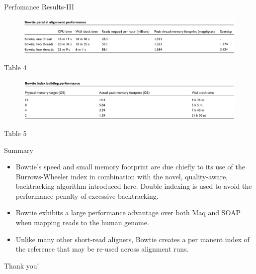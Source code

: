 \documentclass[mathserif]{beamer}
\begin{document}
\begin{frame}{Perfomance Results-III}
    \begin{figure}
        \includegraphics[width=\textwidth]{media/tab4.png}
    \end{figure}\centering \tiny Table 4
    \pause
    \begin{figure}
        \includegraphics[width=\textwidth]{media/tab5.png}
    \end{figure} \centering \tiny Table 5
\end{frame}

\begin{frame}{Summary}
    \begin{itemize}
        \item Bowtie's speed and small memory footprint are due chiefly to
        its use of the Burrows-Wheeler index in combination with the
        novel, quality-aware, backtracking algorithm introduced
        here. Double indexing is used to avoid the performance penalty
        of excessive backtracking.
        \item Bowtie exhibits a large performance advantage over both Maq
        and SOAP when mapping reads to the human genome.
        \item  Unlike many other short-read aligners, Bowtie creates a per
        manent index of the reference that may be re-used across
        alignment runs. 
    \end{itemize}
\end{frame}

\begin{frame}{}
 \begin{center}
    \Huge Thank you!
 \end{center}
\end{frame}
\end{document}
